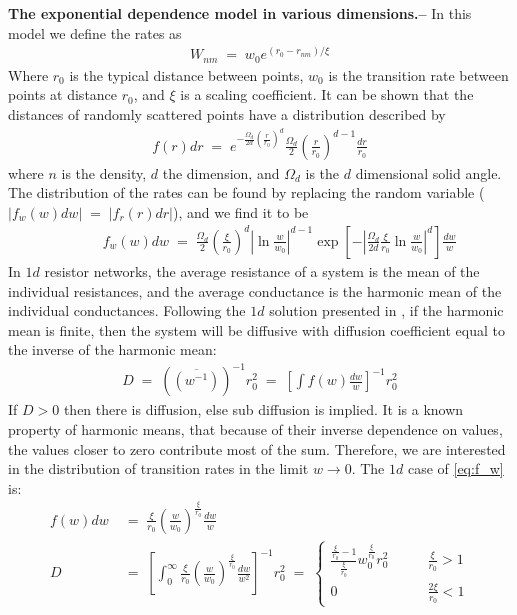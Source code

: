 \documentclass[onecolumn,fleqn,notitlepage,secnumarabic]{revtex4}
\begin{document}
{ \bf The exponential dependence model in various dimensions.--} In this model we define the rates as 
\begin{align} \label{eq:exp_dep}
  W_{nm}\;=\; w_0 e^{(r_0-r_{nm})/ \xi}
\end{align}
Where $r_0$ is the typical distance between points, $w_0$ is the transition rate between points at distance $r_0$, and $\xi$ is a scaling coefficient. It can be shown that the distances of randomly scattered points have a distribution described by 
\begin{align}
  f(r)dr \;=\; e^{-\frac{\Omega_d}{2d} \left(\frac{r}{r_0}\right)^d} \frac{\Omega_d}{2} \left(\frac{r}{r_0}\right)^{d-1}\frac{dr}{r_0}
\end{align}
where $n$ is the density, $d$ the dimension, and $\Omega_d$ is the $d$ dimensional solid angle. The distribution of the rates can be found by replacing the random variable ($|f_w(w)dw| \;=\; |f_r(r)dr|$), and we find it to be 
\begin{align}\label{eq:f_w}
 &\qquad f_w(w)dw \;=\; \frac{\Omega_d}{2}\left(\frac{\xi}{r_0}\right)^d\left|\ln \frac{w}{w_0}\right|^{d-1} \exp\left[-\left|\frac{\Omega_d}{2d}\frac{\xi}{r_0}\ln \frac{w}{w_0}\right|^d\right] \frac{dw}{w}
\end{align}
In $1d$ resistor networks, the average resistance of a system is the mean of the individual resistances, and the average conductance is the harmonic mean of the individual conductances. Following the $1d$ solution presented in \cite{Alexander:1981:RMP}, if the harmonic mean is finite, then the system will be diffusive with diffusion coefficient equal to the inverse of the harmonic mean:
\begin{align}
    D \;=\; \left(\overline{(w^{-1})}\right)^{-1}r_0^2 \;=\; \left[\int f(w) \frac{dw}{w}\right]^{-1} r_0^2
\end{align}
If $D>0$ then there is diffusion, else sub diffusion is implied. It is a known property of harmonic means, that because of their inverse dependence on values, the values closer to zero contribute most of the sum. Therefore, we are interested in the distribution of transition rates in the limit $w\rightarrow 0$. The $1d$ case of \autoref{eq:f_w} is:
\begin{align}\label{eq:1d_D}
f(w)dw &\;=\; \frac{\xi}{r_0} \left(\frac{w}{w_0}\right)^{\frac{\xi}{r_0} }\frac{dw}{w} \\
D &\;=\; \left[\int_0^\infty  \frac{\xi}{r_0} \left(\frac{w}{w_0}\right)^{\frac{\xi}{r_0} } \frac{dw}{w^2}\right]^{-1} r_0^2 \;=\; 
\begin{cases}
    \frac{\frac{\xi}{r_0} -1}{\frac{\xi}{r_0}}w_0^{\frac{\xi}{r_0}} r_0^2 &\qquad \frac{\xi}{r_0} > 1\\
    0  &\qquad \frac{2\xi}{r_0} < 1
\end{cases}
\end{align}
\end{document}
